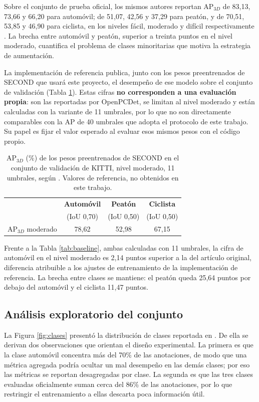\documentclass[11pt,letterpaper]{article}
\begin{document}
Sobre el conjunto de prueba oficial, los mismos autores reportan AP$_{3D}$ de 83,13, 73,66 y 66,20 para automóvil; de 51,07, 42,56 y 37,29 para peatón, y de 70,51, 53,85 y 46,90 para ciclista, en los niveles fácil, moderado y difícil respectivamente \cite{yan2018}. La brecha entre automóvil y peatón, superior a treinta puntos en el nivel moderado, cuantifica el problema de clases minoritarias que motiva la estrategia de aumentación.

La implementación de referencia \cite{openpcdet} publica, junto con los pesos preentrenados de SECOND que usará este proyecto, el desempeño de ese modelo sobre el conjunto de validación (Tabla \ref{tab:openpcdet}). Estas cifras \textbf{no corresponden a una evaluación propia}: son las reportadas por OpenPCDet, se limitan al nivel moderado y están calculadas con la variante de 11 umbrales, por lo que no son directamente comparables con la AP de 40 umbrales que adopta el protocolo de este trabajo. Su papel es fijar el valor esperado al evaluar esos mismos pesos con el código propio.

\begin{table}[htbp]
\caption{AP$_{3D}$ (\%) de los pesos preentrenados de SECOND en el conjunto de validación de KITTI, nivel moderado, 11 umbrales, según \cite{openpcdet}. Valores de referencia, no obtenidos en este trabajo.}
\label{tab:openpcdet}
\centering
\small
\begin{tabular}{@{}lccc@{}}
\toprule
 & \textbf{Automóvil} & \textbf{Peatón} & \textbf{Ciclista} \\
 & (IoU 0,70) & (IoU 0,50) & (IoU 0,50) \\
\midrule
AP$_{3D}$ moderado & 78,62 & 52,98 & 67,15 \\
\bottomrule
\end{tabular}
\end{table}

Frente a la Tabla \ref{tab:baseline}, ambas calculadas con 11 umbrales, la cifra de automóvil en el nivel moderado es 2,14 puntos superior a la del artículo original, diferencia atribuible a los ajustes de entrenamiento de la implementación de referencia. La brecha entre clases se mantiene: el peatón queda 25,64 puntos por debajo del automóvil y el ciclista 11,47 puntos.

\subsection{Análisis exploratorio del conjunto}

La Figura \ref{fig:clases} presentó la distribución de clases reportada en \cite{wirges2018}. De ella se derivan dos observaciones que orientan el diseño experimental. La primera es que la clase automóvil concentra más del 70\% de las anotaciones, de modo que una métrica agregada podría ocultar un mal desempeño en las demás clases; por eso las métricas se reportan desagregadas por clase. La segunda es que las tres clases evaluadas oficialmente suman cerca del 86\% de las anotaciones, por lo que restringir el entrenamiento a ellas descarta poca información útil.
\end{document}
